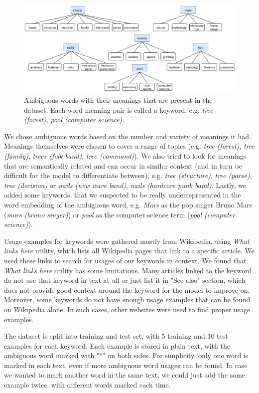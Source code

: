 \documentclass{llncs}
\begin{document}
\begin{figure}
    \centering
    \caption{Ambiguous words with their meanings that are present in the dataset. Each word-meaning pair is called a keyword, e.g. \textit{tree (forest)}, \textit{pool (computer science)}.}
    \label{fig:keywords}
    \includegraphics[scale=0.35]{res/keywords.png}
\end{figure}

We chose ambiguous words based on the number and variety of meanings it had.
Meanings themselves were chosen to cover a range of topics (e.g. \textit{tree (forest)}, \textit{tree (family)}, \textit{trees (folk band)}, \textit{tree (command)}).
We also tried to look for meanings that are semantically related and can occur in similar context (and in turn be difficult for the model to differentiate between), e.g. \textit{tree (structure)}, \textit{tree (parse)}, \textit{tree (decision)} or \textit{nails (new wave band)}, \textit{nails (hardcore punk band)}.
Lastly, we added some keywords, that we suspected to be really underrepresented in the word embedding of the ambiguous word, e.g. \textit{Mars} as the pop singer Bruno Mars (\textit{mars (bruno singer)}) or \textit{pool} as the computer science term (\textit{pool (computer science)}).

Usage examples for keywords were gathered mostly from Wikipedia, using \textit{What links here} utility, which lists all Wikipedia pages that link to a specific article.
We used these links to search for usages of our keywords in context.
We found that \textit{What links here} utility has some limitations.
Many articles linked to the keyword do not use that keyword in text at all or just list it in "See also" section, which does not provide good context around the keyword for the model to improve on.
Moreover, some keywords do not have enough usage examples that can be found on Wikipedia alone.
In such cases, other websites were used to find proper usage examples.

The dataset is split into training and test set, with 5 training and 10 test examples for each keyword.
Each example is stored in plain text, with the ambiguous word marked with "*" on both sides.
For simplicity, only one word is marked in each text, even if more ambiguous word usages can be found.
In case we wanted to mark another word in the same text, we could just add the same example twice, with different words marked each time.
\end{document}

